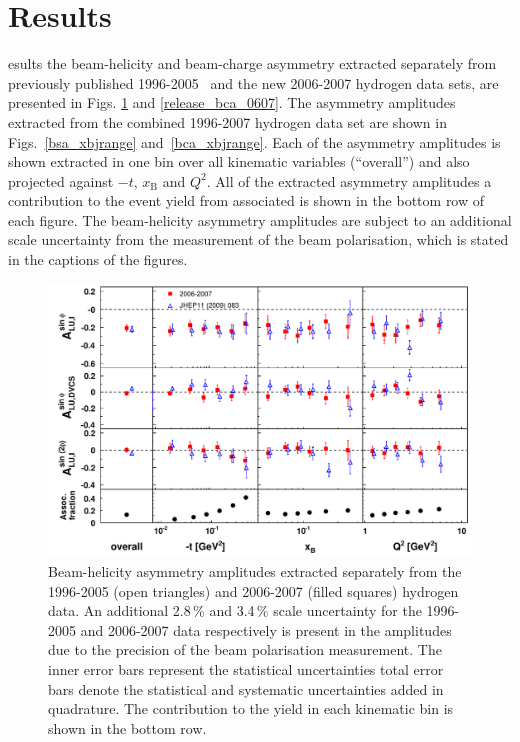 \section{Results}
esults  the beam-helicity and beam-charge asymmetry  extracted separately from previously published 1996-2005~\cite{2009a} and the new 2006-2007 hydrogen data sets, are presented in Figs. \ref{release_bsa_0607} and \ref{release_bca_0607}. The asymmetry amplitudes extracted from the combined 1996-2007 hydrogen data set are shown in Figs.~\ref{bsa_xbjrange} and~\ref{bca_xbjrange}. Each of the asymmetry amplitudes is shown extracted in one bin over all kinematic variables (``overall'') and also projected against $-t$, $x_{\textrm{B}}$ and $Q^{2}$. All of the extracted asymmetry amplitudes  a  contribution to the event yield from associated  is shown in the bottom row of each figure. The beam-helicity asymmetry amplitudes are subject to an additional scale uncertainty from the measurement of the beam polarisation, which is stated in the captions of the figures.
\begin{figure}
\begin{center}
\includegraphics[width=15cm,keepaspectratio]{bsadvcsplots_eml_par13_bin6_release_pic_update_0607_9605}
  \caption{Beam-helicity asymmetry amplitudes extracted separately from
the 1996-2005 (open triangles) and 2006-2007 (filled squares)
hydrogen data.   
An additional 2.8\,\% and 3.4\,\% scale uncertainty for the 1996-2005 and
2006-2007 data respectively is present in the amplitudes due to the precision of
the beam polarisation measurement. The inner error bars represent the statistical uncertainties total error bars denote the statistical and systematic uncertainties added in quadrature. The  contribution  to the yield in each kinematic bin is shown in the bottom row.}
 \label{release_bsa_0607}
\end{center}
 \end{figure}
